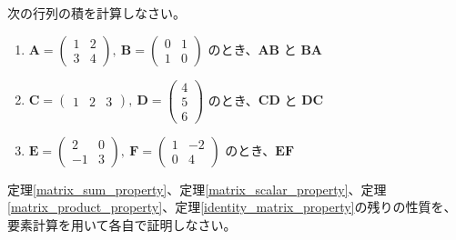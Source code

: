 \begin{quiz}
次の行列の積を計算しなさい。
\begin{enumerate}
\item $\bm{A} = \begin{pmatrix} 1 & 2 \\ 3 & 4 \end{pmatrix},\ \bm{B} = \begin{pmatrix} 0 & 1 \\ 1 & 0 \end{pmatrix}$ のとき、$\bm{A}\bm{B}$ と $\bm{B}\bm{A}$
\item $\bm{C} = \begin{pmatrix} 1 & 2 & 3 \end{pmatrix},\ \bm{D} = \begin{pmatrix} 4 \\ 5 \\ 6 \end{pmatrix}$ のとき、$\bm{C}\bm{D}$ と $\bm{D}\bm{C}$
\item $\bm{E} = \begin{pmatrix} 2 & 0 \\ -1 & 3 \end{pmatrix},\ \bm{F} = \begin{pmatrix} 1 & -2 \\ 0 & 4 \end{pmatrix}$ のとき、$\bm{E}\bm{F}$
\end{enumerate}
\end{quiz}

\begin{quiz}[定理の証明演習]
定理\ref{matrix_sum_property}、定理\ref{matrix_scalar_property}、定理\ref{matrix_product_property}、定理\ref{identity_matrix_property}の残りの性質を、要素計算を用いて各自で証明しなさい。
\end{quiz}